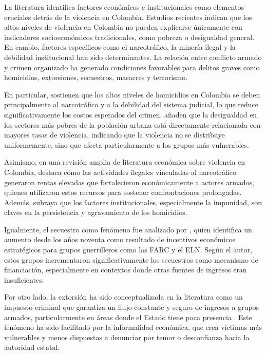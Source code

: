 La literatura identifica factores económicos e institucionales como elementos cruciales detrás de la violencia en Colombia. Estudios recientes indican que los altos niveles de violencia en Colombia no pueden explicarse únicamente con indicadores socioeconómicos tradicionales, como pobreza o desigualdad general. En cambio, factores específicos como el narcotráfico, la minería ilegal y la debilidad institucional han sido determinantes. La relación entre conflicto armado y crimen organizado ha generado condiciones favorables para delitos graves como homicidios, extorsiones, secuestros, masacres y terrorismo.

En particular, \citet{rubio2000} sostienen que los altos niveles de homicidios en Colombia se deben principalmente al narcotráfico y a la debilidad del sistema judicial, lo que reduce significativamente los costos esperados del crimen. \citet{sanchez2003} añaden que la desigualdad en los sectores más pobres de la población urbana está directamente relacionada con mayores tasas de violencia, indicando que la violencia no se distribuye uniformemente, sino que afecta particularmente a los grupos más vulnerables.

Asimismo, \citet{bonilla2009} en una revisión amplia de literatura económica sobre violencia en Colombia, destaca cómo las actividades ilegales vinculadas al narcotráfico generaron rentas elevadas que fortalecieron económicamente a actores armados, quienes utilizaron estos recursos para sostener confrontaciones prolongadas. Además, subraya que los factores institucionales, especialmente la impunidad, son claves en la persistencia y agravamiento de los homicidios.

Igualmente, el secuestro como fenómeno fue analizado por \citet{rubio2003}, quien identifica un aumento desde los años noventa como resultado de incentivos económicos estratégicos para grupos guerrilleros como las FARC y el ELN. Según el autor, estos grupos incrementaron significativamente los secuestros como mecanismo de financiación, especialmente en contextos donde otras fuentes de ingresos eran insuficientes.

Por otro lado, la extorsión ha sido conceptualizada en la literatura como un impuesto criminal que garantiza un flujo constante y seguro de ingresos a grupos armados, particularmente en áreas donde el Estado tiene poca presencia \citet{sanchez2005}. Este fenómeno ha sido facilitado por la informalidad económica, que crea víctimas más vulnerables y menos dispuestas a denunciar por temor o desconfianza hacia la autoridad estatal.

